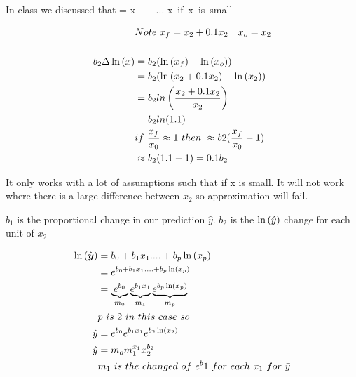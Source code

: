 \documentclass[12pt]{article}
\begin{document}
\begin{enumerate}
In class we discussed that  = {x -  + ...} \approx x\ if\ x\ is\ small\

\begin{align*}
    &Note\  x_f = x_2 + 0.1x_2\ \ \  x_o = x_2 \\ 
    \\
    b_2\Delta\natlog{x} &= b_2(\natlog{x_f} - \natlog{x_o}) \\
                        &= b_2(\natlog{ x_2 + 0.1x_2} - \natlog{x_2}) \\ 
                        &= b_2ln\left(\frac{x_2 + 0.1x_2}{x_2}\right) \\
                        &= b_2ln(1.1) \\
                        &{if\ \frac{x_f}{x_0} \approx 1} \ then\  \approx b2(\frac{x_f}{x_0} - 1) \\
                        &\approx b_2(1.1 - 1) = 0.1b_2
\end{align*}


It only works with a lot of assumptions such that if x is small. It will not work where there is a large difference between $x_2$ so approximation will fail.  


$b_1$ is the proportional change in our prediction $\hat{y}$. $b_2$ is the $\ln\left(\hat{y}\right)$ change for each unit of $x_2$


\begin{align*}
    \ln\left(\hat{\boldsymbol{y}}\right) &= b_0 + b_1 x_1 ....+ b_p \ln\left(x_p\right) \\
    &= e^{b_0 + b_1 x_1 .... + b_p \ln\left(x_p\right)} \\
    &= \underbrace{e^{b_0}}_{m_0} \underbrace{e^{b_1x_1}}_{m_1} \underbrace{e^{b_p \ln\left(x_p\right)}}_{m_p} \\
    &p\ is\ 2\ in\ this\ case\ so\\
    \hat{y} &= e^{b_0}e^{b_1 x_1}e^{ b_2 \ln\left(x_2\right)} \\
    \hat{y} &= m_om_1^{x_1}x_2^{b_2} \\ 
    &{m_1\ is\ the\ changed\ of\ e^b1\ for\ each\ x_1\ for\ \bar{y}}
\end{align*}

\end{enumerate}
\end{document}
